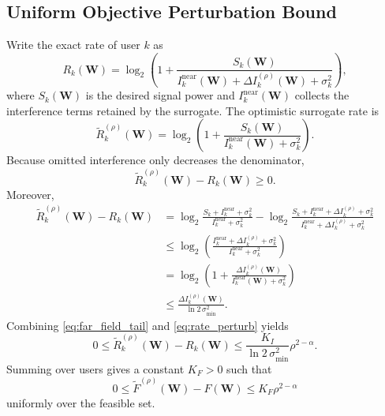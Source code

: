 \subsection{Uniform Objective Perturbation Bound}

Write the exact rate of user $k$ as
\begin{equation}
R_k(\mathbf{W}) =
\log_2 \left( 1 + \frac{S_k(\mathbf{W})}{I_k^{\mathrm{near}}(\mathbf{W}) + \Delta I_k^{(\rho)}(\mathbf{W}) + \sigma_k^2} \right),
\end{equation}
where $S_k(\mathbf{W})$ is the desired signal power and $I_k^{\mathrm{near}}(\mathbf{W})$ collects the interference terms retained by the surrogate. The optimistic surrogate rate is
\begin{equation}
\widetilde{R}_k^{(\rho)}(\mathbf{W}) =
\log_2 \left( 1 + \frac{S_k(\mathbf{W})}{I_k^{\mathrm{near}}(\mathbf{W}) + \sigma_k^2} \right).
\end{equation}
Because omitted interference only decreases the denominator,
\begin{equation}
\widetilde{R}_k^{(\rho)}(\mathbf{W}) - R_k(\mathbf{W}) \ge 0.
\end{equation}
Moreover,
\begin{align}
\widetilde{R}_k^{(\rho)}(\mathbf{W}) - R_k(\mathbf{W})
&=
\log_2 \frac{S_k + I_k^{\mathrm{near}} + \sigma_k^2}{I_k^{\mathrm{near}} + \sigma_k^2}
-
\log_2 \frac{S_k + I_k^{\mathrm{near}} + \Delta I_k^{(\rho)} + \sigma_k^2}
{I_k^{\mathrm{near}} + \Delta I_k^{(\rho)} + \sigma_k^2}
\nonumber \\
&\le
\log_2 \left(
\frac{I_k^{\mathrm{near}} + \Delta I_k^{(\rho)} + \sigma_k^2}
{I_k^{\mathrm{near}} + \sigma_k^2}
\right)
\nonumber \\
&=
\log_2 \left(
1 + \frac{\Delta I_k^{(\rho)}(\mathbf{W})}
{I_k^{\mathrm{near}}(\mathbf{W}) + \sigma_k^2}
\right)
\nonumber \\
&\le
\frac{\Delta I_k^{(\rho)}(\mathbf{W})}{\ln 2 \, \sigma_{\min}^2}.
\label{eq:rate_perturb}
\end{align}
Combining \eqref{eq:far_field_tail} and \eqref{eq:rate_perturb} yields
\begin{equation}
0 \le \widetilde{R}_k^{(\rho)}(\mathbf{W}) - R_k(\mathbf{W})
\le
\frac{K_I}{\ln 2 \, \sigma_{\min}^2} \rho^{2-\alpha}.
\end{equation}
Summing over users gives a constant $K_F > 0$ such that
\begin{equation}
0 \le \widetilde{F}^{(\rho)}(\mathbf{W}) - F(\mathbf{W})
\le
K_F \rho^{2-\alpha}
\label{eq:objective_perturb}
\end{equation}
uniformly over the feasible set.

